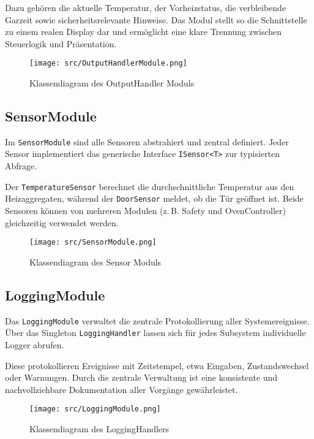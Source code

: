 \documentclass[a4paper,12pt]{article}
\begin{document}
Dazu gehören die aktuelle Temperatur, der Vorheizstatus, die verbleibende Garzeit sowie sicherheitsrelevante Hinweise. Das Modul stellt so die Schnittstelle zu einem realen Display dar und ermöglicht eine klare Trennung zwischen Steuerlogik und Präsentation.

\begin{figure}[h!]
  \centering
  \texttt{[image: src/OutputHandlerModule.png]}
  \caption{Klassendiagram des OutputHandler Moduls}
  \label{fig:outputhandlermodule}
\end{figure}

\newpage

\subsection*{SensorModule}

Im \texttt{SensorModule} sind alle Sensoren abstrahiert und zentral definiert. Jeder Sensor implementiert das generische Interface \texttt{ISensor<T>} zur typisierten Abfrage.

Der \texttt{TemperatureSensor} berechnet die durchschnittliche Temperatur aus den Heizaggregaten, während der \texttt{DoorSensor} meldet, ob die Tür geöffnet ist. Beide Sensoren können von mehreren Modulen (z.\,B. Safety und OvenController) gleichzeitig verwendet werden.

\begin{figure}[h!]
  \centering
  \texttt{[image: src/SensorModule.png]}
  \caption{Klassendiagram des Sensor Moduls}
  \label{fig:sensormodule}
\end{figure}

\newpage

\subsection*{LoggingModule}

Das \texttt{LoggingModule} verwaltet die zentrale Protokollierung aller Systemereignisse. Über das Singleton \texttt{LoggingHandler} lassen sich für jedes Subsystem individuelle Logger abrufen.

Diese protokollieren Ereignisse mit Zeitstempel, etwa Eingaben, Zustandswechsel oder Warnungen. Durch die zentrale Verwaltung ist eine konsistente und nachvollziehbare Dokumentation aller Vorgänge gewährleistet.

\begin{figure}[h!]
  \centering
  \texttt{[image: src/LoggingModule.png]}
  \caption{Klassendiagram des LoggingHandlers}
  \label{fig:loggingmodule}
\end{figure}
\end{document}

